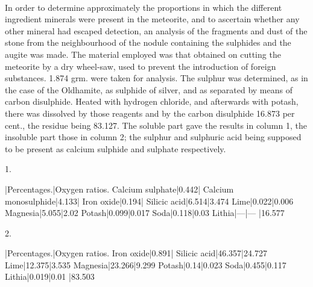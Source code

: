 \documentclass[a4paper, 12pt, oneside]{article}
\begin{document}
\paragraph{}
In order to determine approximately the proportions in which the different ingredient minerals were present in the meteorite, and to ascertain whether any other mineral had escaped detection, an analysis of the fragments and dust of the stone from the neighbourhood of the nodule containing the sulphides and the augite was made. The material employed was that obtained on cutting the meteorite by a dry wheel-saw, used to prevent the introduction of foreign substances. 1.874 grm. were taken for analysis. The sulphur was determined, as in the case of the Oldhamite, as sulphide of silver, and as separated by means of carbon disulphide. Heated with hydrogen chloride, and afterwards with potash, there was dissolved by those reagents and by the carbon disulphide 16.873 per cent., the residue being 83.127. The soluble part gave the results in column 1, the insoluble part those in column 2; the sulphur and sulphuric acid being supposed to be present as calcium sulphide and sulphate respectively.

1.

|Percentages.|Oxygen ratios.  
Calcium sulphate|0.442|  
Calcium monosulphide|4.133|  
Iron oxide|0.194|  
Silicic acid|6.514|3.474  
Lime|0.022|0.006  
Magnesia|5.055|2.02  
Potash|0.099|0.017  
Soda|0.118|0.03  
Lithia|---|---  
|16.577

2.

|Percentages.|Oxygen ratios.  
Iron oxide|0.891|  
Silicic acid|46.357|24.727  
Lime|12.375|3.535  
Magnesia|23.266|9.299
Potash|0.14|0.023  
Soda|0.455|0.117  
Lithia|0.019|0.01  
|83.503
\end{document}
